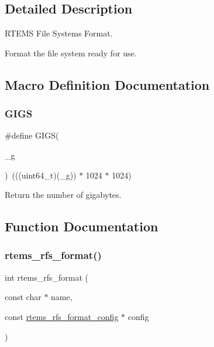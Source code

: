 \subsection{Detailed Description}
R\+T\+E\+MS File Systems Format. 

Format the file system ready for use. 

\subsection{Macro Definition Documentation}
\mbox{\label{rtems-rfs-format_8c_a599d21ff3908f21b90c1d812a0d27b98}} 
\subsubsection{\texorpdfstring{GIGS}{GIGS}}
{\footnotesize\ttfamily \#define G\+I\+GS(\begin{DoxyParamCaption}\item[{}]{\+\_\+g }\end{DoxyParamCaption})~(((uint64\+\_\+t)(\+\_\+g)) $\ast$ 1024 $\ast$ 1024)}

Return the number of gigabytes. 

\subsection{Function Documentation}
\mbox{\label{rtems-rfs-format_8c_a56f021e1569663ecb2f46921a35e1a17}} 
\subsubsection{\texorpdfstring{rtems\_rfs\_format()}{rtems\_rfs\_format()}}
{\footnotesize\ttfamily int rtems\+\_\+rfs\+\_\+format (\begin{DoxyParamCaption}\item[{const char $\ast$}]{name,  }\item[{const \mbox{\hyperlink{rtems-rfs-format_8h_a89d46e05dca9605cef445458620bb003}{rtems\+\_\+rfs\+\_\+format\+\_\+config}} $\ast$}]{config }\end{DoxyParamCaption})}

